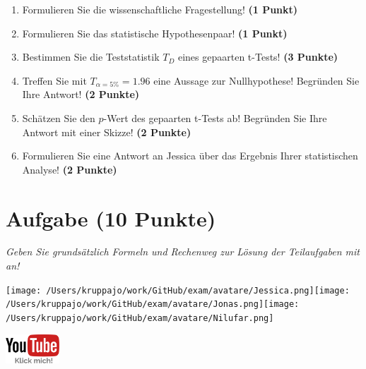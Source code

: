 \documentclass[a4paper, 9pt]{scrartcl}\usepackage[]{graphicx}\usepackage[]{xcolor}
\begin{document}
\begin{enumerate}
  \item Formulieren Sie die wissenschaftliche Fragestellung! \textbf{(1 Punkt)}
  \item Formulieren Sie das statistische Hypothesenpaar! \textbf{(1 Punkt)}
  \item Bestimmen Sie die Teststatistik $T_{D}$ eines gepaarten t-Tests! \textbf{(3 Punkte)}
  \item Treffen Sie mit $T_{\alpha = 5\%} = 1.96$ eine Aussage zur Nullhypothese! Begründen Sie Ihre Antwort! \textbf{(2 Punkte)}
\item Schätzen Sie den $p$-Wert des gepaarten t-Tests ab! Begründen Sie Ihre Antwort mit einer Skizze! \textbf{(2 Punkte)}
\item Formulieren Sie eine Antwort an Jessica über das Ergebnis Ihrer statistischen Analyse! \textbf{(2 Punkte)}
\end{enumerate}


 
\clearpage

\section{Aufgabe \hfill (10 Punkte)}

\textit{Geben Sie grundsätzlich Formeln und Rechenweg zur Lösung der Teilaufgaben mit an!} \\[1Ex]
 

 
\begin{minipage}[t]{0.5\textwidth}
\texttt{[image: /Users/kruppajo/work/GitHub/exam/avatare/Jessica.png]}\hspace{-4mm}\texttt{[image: /Users/kruppajo/work/GitHub/exam/avatare/Jonas.png]}\hspace{-4mm}\texttt{[image: /Users/kruppajo/work/GitHub/exam/avatare/Nilufar.png]}
\end{minipage}
\begin{minipage}[t]{0.5\textwidth}
\hfill
\href{https://youtu.be/exDo7AyHl4Q}{\includegraphics[width = 2cm]{img/youtube}}
\end{minipage}
\end{document}

